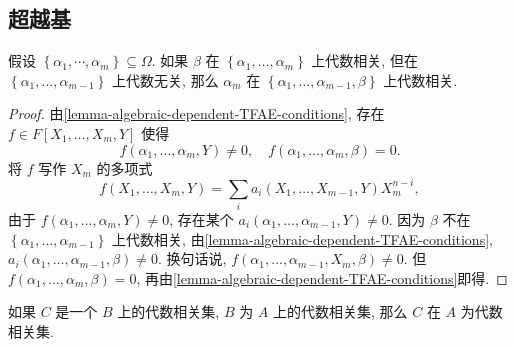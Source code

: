 \subsection{超越基}

\begin{lemma}[交换性质]
  \label{lemma-exchange-algebraically-denpent}
  假设 \( \left\lbrace \alpha_1, \cdots, \alpha_m \right\rbrace \subseteq \Omega
  \).
  如果 \( \beta \) 在 \( \left\lbrace \alpha_1, \ldots, \alpha_m
  \right\rbrace \) 上代数相关, 但在 \( \left\lbrace \alpha_1, \ldots, \alpha_{m
  - 1} \right\rbrace \) 上代数无关, 那么 \( \alpha_m \) 在 \( \left\lbrace
  \alpha_1, \ldots, \alpha_{m - 1}, \beta \right\rbrace \) 上代数相关.
\end{lemma}
\begin{proof}
  由\cref{lemma-algebraic-dependent-TFAE-conditions}, 存在 \( f \in F[X_1,
  \ldots, X_m, Y] \) 使得
  \[
    f(\alpha_1, \ldots, \alpha_m, Y) \neq 0,\quad f(\alpha_1, \ldots, \alpha_m,
    \beta)= 0.
  \]
  将 \( f \) 写作 \( X_m \) 的多项式
  \[
    f(X_1, \ldots, X_m, Y) = \sum_i a_i(X_1, \ldots, X_{m - 1}, Y) X^{n - i}_m,
  \]
  由于 \( f(\alpha_1, \ldots, \alpha_m, Y) \neq 0 \), 存在某个 \( a_i(\alpha_1,
  \ldots, \alpha_{m - 1}, Y) \neq 0 \).
  因为 \( \beta \) 不在 \( \left\lbrace \alpha_1, \ldots, \alpha_{m - 1}
  \right\rbrace \) 上代数相关,
  由\cref{lemma-algebraic-dependent-TFAE-conditions}, \( a_i(\alpha_1, \ldots,
  \alpha_{m - 1}, \beta) \neq 0 \).
  换句话说, \( f(\alpha_1, \ldots, \alpha_{m - 1}, X_m, \beta) \neq 0 \).
  但 \( f(\alpha_1, \ldots, \alpha_{m}, \beta) = 0 \),
  再由\cref{lemma-algebraic-dependent-TFAE-conditions}即得.
\end{proof}
\begin{lemma}[代数相关的传递性]
  \label{lemma-transitivity-of-algebraic-dependence}
  如果 \( C \) 是一个 \( B \) 上的代数相关集, \( B \) 为 \( A \) 上的代数相关集,
  那么 \( C \) 在 \( A \) 为代数相关集.
\end{lemma}

